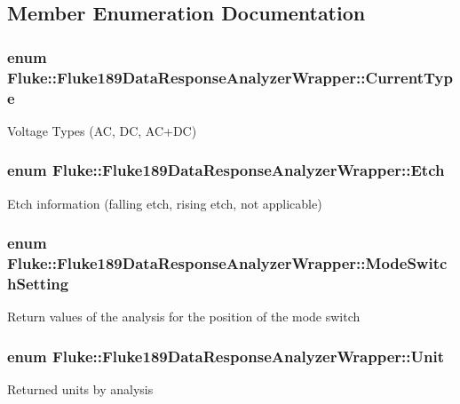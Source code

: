 \subsection{Member Enumeration Documentation}
\hypertarget{classFluke_1_1Fluke189DataResponseAnalyzerWrapper_afef24496da239e3613c40ad3582d7adc}{
\subsubsection[{CurrentType}]{\setlength{\rightskip}{0pt plus 5cm}enum {\bf Fluke::Fluke189DataResponseAnalyzerWrapper::CurrentType}}}
\label{classFluke_1_1Fluke189DataResponseAnalyzerWrapper_afef24496da239e3613c40ad3582d7adc}
Voltage Types (AC, DC, AC+DC) \hypertarget{classFluke_1_1Fluke189DataResponseAnalyzerWrapper_ada71f6ab32a7b0eb40bb0ed96d7053bc}{
\subsubsection[{Etch}]{\setlength{\rightskip}{0pt plus 5cm}enum {\bf Fluke::Fluke189DataResponseAnalyzerWrapper::Etch}}}
\label{classFluke_1_1Fluke189DataResponseAnalyzerWrapper_ada71f6ab32a7b0eb40bb0ed96d7053bc}
Etch information (falling etch, rising etch, not applicable) \hypertarget{classFluke_1_1Fluke189DataResponseAnalyzerWrapper_a2ec2700a6086ae0ebd9601fe0c0f957a}{
\subsubsection[{ModeSwitchSetting}]{\setlength{\rightskip}{0pt plus 5cm}enum {\bf Fluke::Fluke189DataResponseAnalyzerWrapper::ModeSwitchSetting}}}
\label{classFluke_1_1Fluke189DataResponseAnalyzerWrapper_a2ec2700a6086ae0ebd9601fe0c0f957a}
Return values of the analysis for the position of the mode switch \hypertarget{classFluke_1_1Fluke189DataResponseAnalyzerWrapper_ab8e5f2306e4d2ad3d741d273793aaed1}{
\subsubsection[{Unit}]{\setlength{\rightskip}{0pt plus 5cm}enum {\bf Fluke::Fluke189DataResponseAnalyzerWrapper::Unit}}}
\label{classFluke_1_1Fluke189DataResponseAnalyzerWrapper_ab8e5f2306e4d2ad3d741d273793aaed1}
Returned units by analysis 

